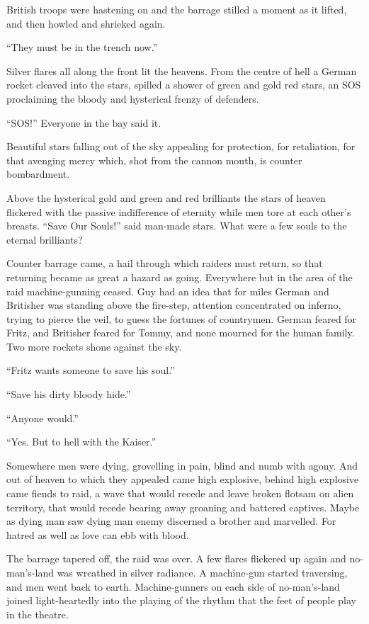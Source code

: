 British troops were hastening on and the barrage stilled a moment as it lifted, and then howled and shrieked again.

``They must be in the trench now.''

Silver flares all along the front lit the heavens. From the centre of hell a German rocket cleaved into the stars, spilled a shower of green and gold red stars, an SOS proclaiming the bloody and hysterical frenzy of defenders.

``SOS!'' Everyone in the bay said it.

Beautiful stars falling out of the sky appealing for protection, for retaliation, for that avenging mercy which, shot from the cannon mouth, is counter bombardment.

Above the hysterical gold and green and red brilliants the stars of heaven flickered with the passive indifference of eternity while men tore at each other's breasts. ``Save Our Souls!'' said man-made stars. What were a few souls to the eternal brilliants?

Counter barrage came, a hail through which raiders must return, so that returning became as great a hazard as going. Everywhere but in the area of the raid machine-gunning ceased. Guy had an idea that for miles German and Britisher was standing above the fire-step, attention concentrated on inferno, trying to pierce the veil, to guess the fortunes of countrymen. German feared for Fritz, and Britisher feared for Tommy, and none mourned for the human family. Two more rockets shone against the sky.

``Fritz wants someone to save his soul.''

``Save his dirty bloody hide.''

``Anyone would.''

``Yes. But to hell with the Kaiser.''

Somewhere men were dying, grovelling in pain, blind and numb with agony. And out of heaven to which they appealed came high explosive, behind high explosive came fiends to raid, a wave that would recede and leave broken flotsam on alien territory, that would recede bearing away groaning and battered captives. Maybe as dying man saw dying man enemy discerned a brother and marvelled. For hatred as well as love can ebb with blood.

The barrage tapered off, the raid was over. A few flares flickered up again and no-man's-land was wreathed in silver radiance. A machine-gun started traversing, and men went back to earth. Machine-gunners on each side of no-man's-land joined light-heartedly into the playing of the rhythm that the feet of people play in the theatre.

